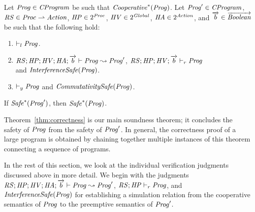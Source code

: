 \begin{theorem}
\label{thm:correctness}
Let $\mathit{Prog} \in \mathit{CProgram}$ be such that $\mathit{Cooperative}^*(\mathit{Prog})$.
Let $\mathit{Prog}' \in \mathit{CProgram}$, $\mathit{RS} \in \mathit{Proc} \rightharpoonup \mathit{Action}$, $\mathit{HP} \in 2^{\mathit{Proc}}$, 
$\mathit{HV} \in 2^{\mathit{Global}}$, $\mathit{HA} \in 2^{\mathit{Action}}$,
and $\overrightarrow{b} \in \overrightarrow{\mathit{Boolean}}$ be such that the following hold:
\begin{enumerate}
\item
$\vdash_l \mathit{Prog}$.
\item
$\mathit{RS};\mathit{HP};\mathit{HV};\mathit{HA};\overrightarrow{b} \vdash \mathit{Prog} \leadsto \mathit{Prog}'$,
$\mathit{RS};\mathit{HP};\mathit{HV};\overrightarrow{b} \vdash_r \mathit{Prog}$ \\ and $\mathit{InterferenceSafe}(\mathit{Prog})$.
\item
$\vdash_y \mathit{Prog}$ and $\mathit{CommutativitySafe}(\mathit{Prog})$.
\end{enumerate}
If $\mathit{Safe}^*(\mathit{Prog}')$, then $\mathit{Safe}^*(\mathit{Prog})$.
\end{theorem}

Theorem~\ref{thm:correctness} is our main soundness theorem;
it concludes the safety of $\mathit{Prog}$ from the safety of $\mathit{Prog}'$.
In general, the correctness proof of a large program is obtained by chaining together
multiple instances of this theorem connecting a sequence of programs.  

In the rest of this section, we look at the individual verification judgments discussed above in more detail.
We begin with the judgments $\mathit{RS};\mathit{HP};\mathit{HV};\mathit{HA};\overrightarrow{b} \vdash \mathit{Prog} \leadsto \mathit{Prog}'$,
$\mathit{RS};\mathit{HP} \vdash_r \mathit{Prog}$, and $\mathit{InterferenceSafe}(\mathit{Prog})$ for establishing a simulation relation from 
the cooperative semantics of $\mathit{Prog}$ to the preemptive semantics of $\mathit{Prog}'$.


